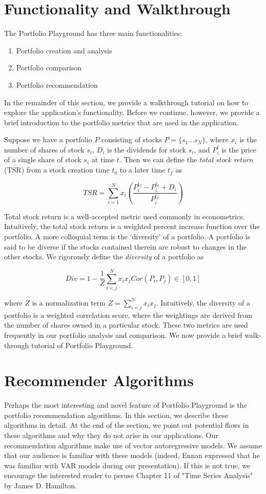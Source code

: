 \documentclass{article}
\begin{document}
\section{Functionality and Walkthrough} \label{sec:fun_walk}
The Portfolio Playground has three main functionalities:
\begin{enumerate}
	\item Portfolio creation and analysis
	\item Portfolio comparison
	\item Portfolio recommendation
\end{enumerate}
In the remainder of this section, we provide a walkthrough tutorial on how to explore the application's functionality. Before we continue, however, we provide a brief introduction to the portfolio metrics that are used in the application.

Suppose we have a portfolio $P$ consisting of stocks $P = \{s_1\dots s_N\}$, where $x_i$ is the number of shares of stock $s_i$, $D_i$ is the dividends for stock $s_i$, and $P^{t}_{i}$ is the price of a single share of stock $s_i$ at time $t$. Then we can define the \emph{total stock return} (TSR) from a stock creation time $t_0$ to a later time $t_f$ as 

$$TSR = \sum_{i=1}^N x_i \left( \frac{P^{t_f}_{i} - P^{t_0}_{i} + D_i}{P^{t_0}_{i}} \right) $$

Total stock return is a well-accepted metric used commonly in econometrics. Intuitively, the total stock return is a weighted percent increase function over the portfolio. A more colloquial term is the `diversity' of a portfolio. A portfolio is said to be diverse if the stocks contained therein are robust to changes in the other stocks. We rigorously define the \emph{diversity} of a portfolio as

$$Div = 1 - \frac{1}{Z} \sum_{i<j}^N x_i x_j Cor(P_i,P_j) \in \left[ 0,1 \right]$$

where $Z$ is a normalization term $Z = \sum_{i<j}^N x_i x_j$. Intuitively, the diversity of a portfolio is a weighted correlation score, where the weightings are derived from the number of shares owned in a particular stock. These two metrics are used frequently in our portfolio analysis and comparison. We now provide a brief walk-through tutorial of Portfolio Playground.


\section{Recommender Algorithms} \label{sec:alg}
Perhaps the most interesting and novel feature of Portfolio Playground is the portfolio recommendation algorithms. In this section, we describe these algorithms in detail. At the end of the section, we point out potential flaws in these algorithms and why they do not arise in our applications. Our recommendation algorithms make use of vector autoregressive models. We assume that our audience is familiar with these models (indeed, Ennan expressed that he was familiar with VAR models during our presentation). If this is not true, we encourage the interested reader to peruse Chapter 11 of "Time Series Analysis" by James D. Hamilton.
\end{document}
